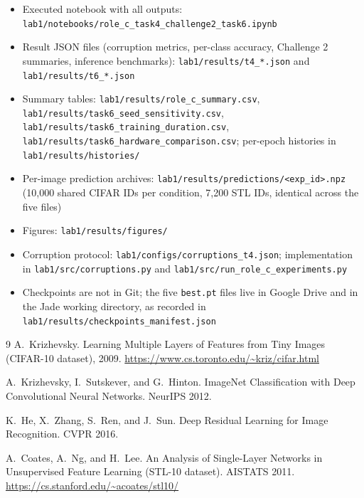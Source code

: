 \documentclass[11pt,a4paper]{article}
\begin{document}
\begin{itemize}[leftmargin=1.5em]
  \item Executed notebook with all outputs:
    \nolinkurl{lab1/notebooks/role_c_task4_challenge2_task6.ipynb}
  \item Result JSON files (corruption metrics, per-class accuracy,
    Challenge 2 summaries, inference benchmarks):
    \nolinkurl{lab1/results/t4_*.json} and \nolinkurl{lab1/results/t6_*.json}
  \item Summary tables: \nolinkurl{lab1/results/role_c_summary.csv},
    \nolinkurl{lab1/results/task6_seed_sensitivity.csv},
    \nolinkurl{lab1/results/task6_training_duration.csv},
    \nolinkurl{lab1/results/task6_hardware_comparison.csv}; per-epoch
    histories in \nolinkurl{lab1/results/histories/}
  \item Per-image prediction archives:
    \nolinkurl{lab1/results/predictions/<exp_id>.npz} (10,000 shared CIFAR
    IDs per condition, 7,200 STL IDs, identical across the five files)
  \item Figures: \nolinkurl{lab1/results/figures/}
  \item Corruption protocol: \nolinkurl{lab1/configs/corruptions_t4.json};
    implementation in \nolinkurl{lab1/src/corruptions.py} and
    \nolinkurl{lab1/src/run_role_c_experiments.py}
  \item Checkpoints are not in Git; the five \texttt{best.pt} files live in
    Google Drive and in the Jade working directory, as recorded in
    \nolinkurl{lab1/results/checkpoints_manifest.json}
\end{itemize}

\begin{thebibliography}{9}
A.~Krizhevsky.
\newblock Learning Multiple Layers of Features from Tiny Images (CIFAR-10
dataset), 2009.
\newblock \url{https://www.cs.toronto.edu/~kriz/cifar.html}

A.~Krizhevsky, I.~Sutskever, and G.~Hinton.
\newblock ImageNet Classification with Deep Convolutional Neural Networks.
\newblock NeurIPS 2012.

K.~He, X.~Zhang, S.~Ren, and J.~Sun.
\newblock Deep Residual Learning for Image Recognition.
\newblock CVPR 2016.

A.~Coates, A.~Ng, and H.~Lee.
\newblock An Analysis of Single-Layer Networks in Unsupervised Feature
Learning (STL-10 dataset).
\newblock AISTATS 2011.
\newblock \url{https://cs.stanford.edu/~acoates/stl10/}
\end{thebibliography}
\end{document}
